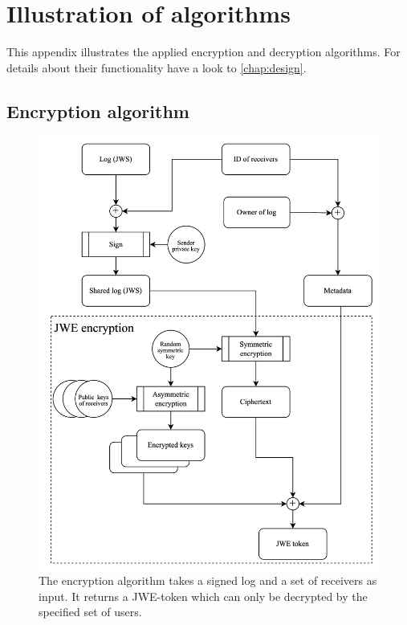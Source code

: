 \documentclass[../main.tex]{subfiles}
\begin{document}
\chapter{Illustration of algorithms}

This appendix illustrates the applied encryption and decryption algorithms.
For details about their functionality have a look to \cref{chap:design}.

\section{Encryption algorithm}
\label{app:encryption}
\begin{figure}[h]
    \includegraphics[scale=0.158]{../img/05/encrypt_logs.png}
    \centering
    \caption[Encryption algorithm]{The encryption algorithm takes a signed log and a set of receivers as input. It returns a JWE-token which can only be decrypted by the specified set of users.}
    \label{app:encryption_algo}
\end{figure}
\newpage
\end{document}
